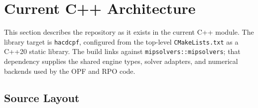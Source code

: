 \section{Current C++ Architecture}
\label{sec:architecture}

This section describes the repository as it exists in the current C++ module.
The library target is \texttt{hacdcpf}, configured from the top-level
\texttt{CMakeLists.txt} as a C++20 static library.  The build links against
\texttt{mipsolvers::mipsolvers}; that dependency supplies the shared engine
types, solver adapters, and numerical backends used by the OPF and RPO code.

\subsection{Source Layout}

